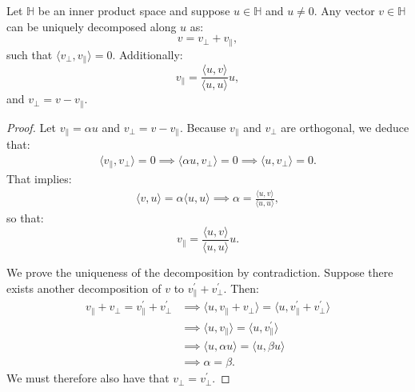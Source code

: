\begin{lemma}
    Let $\mathbb{H}$ be an inner product space and suppose $u \in \mathbb{H}$ and $u \neq 0$.
    Any vector $v \in \mathbb{H}$ can be uniquely decomposed along $u$ as:
    \begin{equation*}
        v = v_{\perp} + v_{\parallel},
    \end{equation*}
    such that $\langle v_\perp, v_\parallel \rangle = 0$. Additionally:
    \begin{equation*}
        v_\parallel = \frac{\langle u, v \rangle}{\langle u, u \rangle} u,
    \end{equation*}
    and $v_\perp = v - v_\parallel$.
\end{lemma}
\begin{proof}
    Let $v_\parallel = \alpha u$ and $v_\perp = v - v_\parallel$.
    Because $v_\parallel$ and $v_\perp$ are orthogonal, we deduce that:
    \begin{align*}
        \langle v_\parallel, v_\perp \rangle = 0 \implies
            \langle \alpha u, v_\perp \rangle = 0 \implies
            \langle u, v_\perp \rangle = 0.
    \end{align*}
    That implies:
    \begin{align*}
        \langle v, u \rangle = \alpha \langle u, u \rangle \implies
        \alpha = \frac{\langle u, v \rangle}{\langle u, u \rangle},
    \end{align*}
    so that:
    \begin{equation*}
        v_\parallel = \frac{\langle u, v \rangle}{\langle u, u \rangle} u.
    \end{equation*}

    We prove the uniqueness of the decomposition by contradiction.
    Suppose there exists another decomposition of $v$ to $v_\parallel^\prime + v_\perp^\prime$.
    Then:
    \begin{align*}
        v_\parallel + v_\perp = v_\parallel^\prime + v_\perp^\prime &\implies
        \langle u, v_\parallel + v_\perp \rangle = \langle u,  v_\parallel^\prime + v_\perp^\prime\rangle \\
        &\implies \langle u, v_\parallel \rangle = \langle u,  v_\parallel^\prime \rangle \\
        &\implies \langle u, \alpha u \rangle = \langle u, \beta u \rangle \\
        &\implies \alpha = \beta.
    \end{align*}
    We must therefore also have that $v_\perp = v_\perp^\prime$.
\end{proof}
